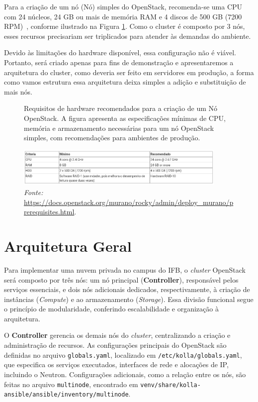 Para a criação de um nó (Nó) simples do OpenStack, recomenda-se uma CPU com 24 núcleos, 24 GB ou mais de memória RAM e 4 discos de 500 GB (7200 RPM)~\citep{DocumentacaoOpenstack}, conforme ilustrado na Figura \ref{fig:hardware_requirements}. Como o cluster é composto por 3 nós, esses recursos precisariam ser triplicados para atender às demandas do ambiente.

Devido às limitações do hardware disponível, essa configuração não é viável. Portanto, será criado apenas para fins de demonstração e apresentaremos a arquitetura do cluster, como deveria ser feito em servidores em produção, a forma como vamos estrutura essa arquitetura deixa simples a adição e substituição de mais nós.

\begin{figure}[htbp]
    \centering
    \caption{Requisitos de hardware recomendados para a criação de um Nó OpenStack. A figura apresenta as especificações mínimas de CPU, memória e armazenamento necessárias para um nó OpenStack simples, com recomendações para ambientes de produção.}
    \includegraphics[width=0.9\textwidth]{images/hardware_requirements.png}
    \caption*{\textit{Fonte:} \url{https://docs.openstack.org/murano/rocky/admin/deploy_murano/prerequisites.html}.}
    \label{fig:hardware_requirements}
\end{figure}


\section{Arquitetura Geral}

Para implementar uma nuvem privada no campus do IFB, o \textit{cluster} OpenStack será composto por três nós: um nó principal (\textbf{Controller}), responsável pelos serviços essenciais, e dois nós adicionais dedicados, respectivamente, à criação de instâncias (\textit{Compute}) e ao armazenamento (\textit{Storage}). Essa divisão funcional segue o princípio de modularidade, conferindo escalabilidade e organização à arquitetura.

O \textbf{Controller} gerencia os demais nós do \textit{cluster}, centralizando a criação e administração de recursos. As configurações principais do OpenStack são definidas no arquivo \texttt{globals.yaml}, localizado em \texttt{/etc/kolla/globals.yaml}, que especifica os serviços executados, interfaces de rede e alocações de IP, incluindo o Neutron. Configurações adicionais, como a relação entre os nós, são feitas no arquivo \texttt{multinode}, encontrado em \texttt{venv/share/kolla-ansible/ansible/inventory/multinode}.

